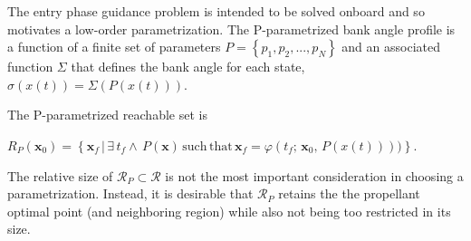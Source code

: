 \documentclass[letterpaper, preprint, paper,11pt]{AAS}
\begin{document}
The entry phase guidance problem is intended to be solved onboard and so motivates a low-order parametrization. The P-parametrized bank angle profile is a function of a finite set of parameters $P = \left\{p_1, p_2, ...,p_N \right\}$ and an associated function $\Sigma$ that defines the bank angle for each state, $\sigma(x(t)) = \Sigma(P(x(t)))$.

The P-parametrized reachable set is 

$R_P(\mathbf{x}_0) =\left\{\mathbf{x}_f \,| \,\exists\, t_f \land\, P(\mathbf{x}) \,\mathrm{such\, that}\, \mathbf{x}_f = \varphi(t_f;\,\mathbf{x}_0,\, P(x(t))))  \right\} $. 

The relative size of $\mathcal{R}_P \subset \mathcal{R}$ is not the most important consideration in choosing a parametrization. Instead, it is desirable that $\mathcal{R}_P$ retains the the propellant optimal point (and neighboring region) while also not being too restricted in its size. 
\end{document}
